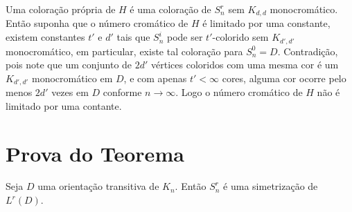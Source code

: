Uma coloração própria de $H$ é uma coloração de $S_n^r$ sem $K_{d,d}$ monocromático. Então suponha que o número cromático de $H$ é limitado por uma constante, existem constantes $t'$ e $d'$ tais que $S_n^i$ pode ser $t'$-colorido sem $K_{d',d'}$ monocromático, em particular, existe tal coloração para $S_n^0 = D$. Contradição, pois note que um conjunto de $2d'$ vértices coloridos com uma mesma cor é um $K_{d',d'}$ monocromático em $D$, e com apenas $t' < \infty$ cores, alguma cor ocorre pelo menos $2d'$ vezes em $D$ conforme $n\rightarrow\infty$. Logo o número cromático de $H$ não é limitado por uma contante.

\section{Prova do Teorema}

\begin{afirmacao}\label{shiftafirm1}
Seja $D$ uma orientação transitiva de $K_n$. Então $S_n^r$ é uma simetrização de $L^r(D)$.
\end{afirmacao}

